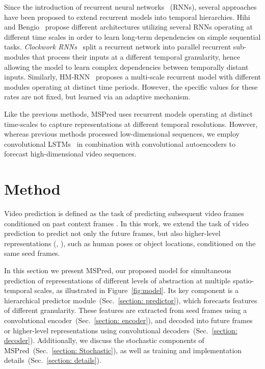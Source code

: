 \documentclass{bmvc2k}
\newcommand{\Figure}[1]{Figure~\ref{#1}}
\begin{document}
Since the introduction of recurrent neural networks~\cite{Elman_FindingStructureInTime_1990,Hochreiter_LongShortTermMemory_1997} (RNNs), several approaches have been proposed to extend recurrent models into temporal hierarchies.
Hihi and Bengio~\cite{Hihi_HierarchicalRNNsForLongTermDependencies_1995} propose different architectures utilizing several RNNs operating at different time scales in order to learn long-term dependencies on simple sequential tasks.
\emph{Clockwork RNNs}~\cite{Koutnik_ClockworkRNN_2014} split a recurrent network into parallel recurrent sub-modules that process their inputs at a different temporal granularity, hence allowing the model to learn complex dependencies between temporally distant inputs.
Similarly, HM-RNN~\cite{Chung_HierarchicalMultiscaleRNNs_2016} proposes a multi-scale recurrent model with different modules operating at distinct time periods. However, the specific values for these rates are not fixed, but learned via an adaptive mechanism.

Like the previous methods, MSPred uses recurrent models operating at distinct time-scales to capture representations at different temporal resolutions. However, whereas previous methods processed low-dimensional sequences, we employ convolutional LSTMs~\cite{Shi_ConvLSTMNetworkPrecipitationNowcasting_2015} in combination with convolutional autoencoders to forecast high-dimensional video sequences.





\vspace{-0.3cm}
\section{Method}

Video prediction is defined as the task of predicting subsequent video frames  conditioned on  past context frames .
In this work, we extend the task of video prediction to predict not only the future frames, but also higher-level representations (, ), such as human poses or object locations, conditioned on the same seed frames.

In this section we present MSPred, our proposed model for simultaneous prediction of representations of different levels of abstraction at multiple spatio-temporal scales, as illustrated in \Figure{fig:model}.
Its key component is a hierarchical predictor module~(Sec.~\ref{section: predictor}), which forecasts features of different granularity. These features are extracted from seed frames using a convolutional encoder~(Sec.~\ref{section: encoder}), and decoded into future frames or higher-level representations using convolutional decoders~(Sec.~\ref{section: decoder}).
Additionally, we discuss the stochastic components of MSPred~(Sec.~\ref{section: Stochastic}), as well as training and implementation details~(Sec.~\ref{section: details}).
\end{document}
